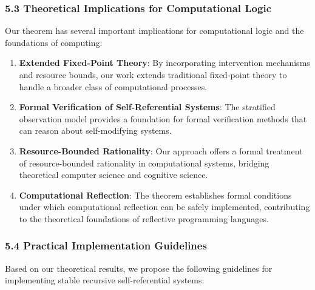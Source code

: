 \documentclass[
]{article}
\begin{document}
\subsubsection{5.3 Theoretical Implications for Computational
Logic}\label{theoretical-implications-for-computational-logic}

Our theorem has several important implications for computational logic
and the foundations of computing:

\begin{enumerate}
\def\labelenumi{\arabic{enumi}.}
\item
  \textbf{Extended Fixed-Point Theory}: By incorporating intervention
  mechanisms and resource bounds, our work extends traditional
  fixed-point theory to handle a broader class of computational
  processes.
\item
  \textbf{Formal Verification of Self-Referential Systems}: The
  stratified observation model provides a foundation for formal
  verification methods that can reason about self-modifying systems.
\item
  \textbf{Resource-Bounded Rationality}: Our approach offers a formal
  treatment of resource-bounded rationality in computational systems,
  bridging theoretical computer science and cognitive science.
\item
  \textbf{Computational Reflection}: The theorem establishes formal
  conditions under which computational reflection can be safely
  implemented, contributing to the theoretical foundations of reflective
  programming languages.
\end{enumerate}

\subsubsection{5.4 Practical Implementation
Guidelines}\label{practical-implementation-guidelines-1}

Based on our theoretical results, we propose the following guidelines
for implementing stable recursive self-referential systems:
\end{document}
